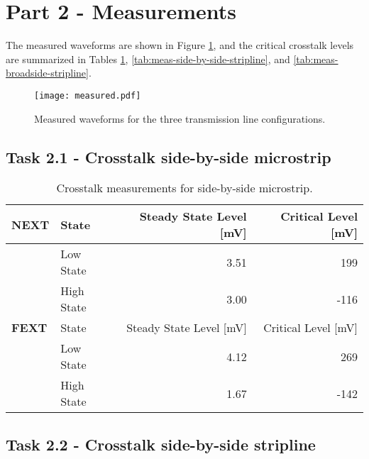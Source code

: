\documentclass[../main.tex]{subfiles}
\begin{document}
\section{Part 2 - Measurements}

The measured waveforms are shown in Figure \ref{fig:meas-waveforms}, and the critical crosstalk levels are summarized in Tables \ref{tab:meas-side-by-side-microstrip}, \ref{tab:meas-side-by-side-stripline}, and \ref{tab:meas-broadside-stripline}.

\begin{figure}[h]
    \centering
    \texttt{[image: measured.pdf]}
    \caption{Measured waveforms for the three transmission line configurations.}
    \label{fig:meas-waveforms}
\end{figure}

\subsection{Task 2.1 - Crosstalk side-by-side microstrip}

\begin{table}[h]
    \centering
    \begin{tabular}{l l|r r}
        \toprule[1pt]
        \textbf{NEXT} & State & Steady State Level [mV] & Critical Level [mV] \\
        \midrule
        & Low State & 3.51 & 199 \\
        & High State & 3.00 & -116 \\
        \midrule[1pt]
        \textbf{FEXT} & State & Steady State Level [mV] & Critical Level [mV] \\
        \midrule
        & Low State & 4.12 & 269 \\
        & High State & 1.67 & -142 \\
        \bottomrule[1pt]
    \end{tabular}
    \caption{Crosstalk measurements for side-by-side microstrip.}
    \label{tab:meas-side-by-side-microstrip}
\end{table}

\subsection{Task 2.2 - Crosstalk side-by-side stripline}
\end{document}
